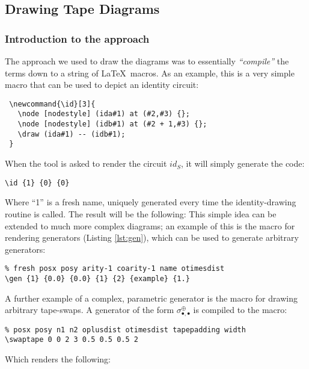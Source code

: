 \documentclass{article}
\begin{document}
\subsection{Drawing Tape Diagrams}

\subsubsection{Introduction to the approach}

The approach we used to draw the diagrams was to essentially \emph{``compile''} the terms down to a string of \LaTeX \, macros. As an example, this is a very simple macro that can be used to depict an identity circuit:

\begin{lstlisting}[caption=\LaTeX \, macro for rendering identities.]
 % fresh posx posy
 \newcommand{\id}[3]{
   \node [nodestyle] (ida#1) at (#2,#3) {};
   \node [nodestyle] (idb#1) at (#2 + 1,#3) {};
   \draw (ida#1) -- (idb#1);
 }
\end{lstlisting}
When the tool is asked to render the circuit $id_S$, it will simply generate the code:
\begin{lstlisting}
\id {1} {0} {0}
\end{lstlisting}
Where ``1'' is a fresh name, uniquely generated every time the identity-drawing routine is called. The result will be the following:
This simple idea can be extended to much more complex diagrams; an example of this is the macro for rendering generators (Listing \ref{lst:gen}), which can be used to generate arbitrary generators:

\begin{lstlisting}
% fresh posx posy arity-1 coarity-1 name otimesdist
\gen {1} {0.0} {0.0} {1} {2} {example} {1.}
\end{lstlisting}

A further example of a complex, parametric generator is the macro for drawing arbitrary tape-swaps. A generator of the form $\sigma^{\oplus}_{\bullet, \bullet}$ is compiled to the macro:

\begin{lstlisting}
% posx posy n1 n2 oplusdist otimesdist tapepadding width
\swaptape 0 0 2 3 0.5 0.5 0.5 2
\end{lstlisting}
Which renders the following:
\end{document}
